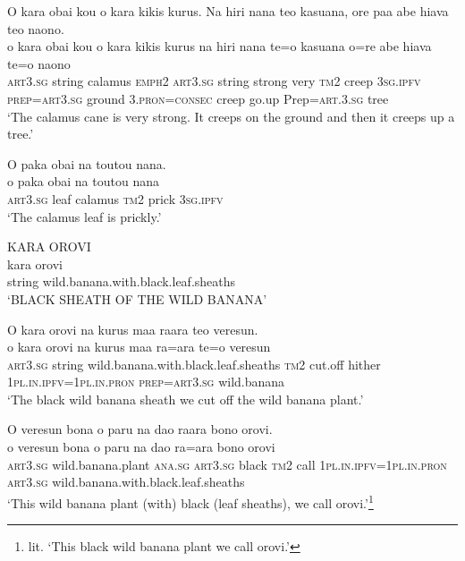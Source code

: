 \ea\label{ex:text7-48}
O kara obai kou o kara kikis kurus. Na hiri nana teo kasuana, ore paa abe hiava teo naono.\\
\gll o	kara	obai	kou	o	kara	kikis	kurus	na	hiri	nana	te=o	kasuana	o=re	abe	hiava	te=o	naono\\
     \textsc{art}3.\textsc{sg}	string	calamus	\textsc{emph}2	\textsc{art}3.\textsc{sg}	string	strong	very	\textsc{tm}2	creep	3\textsc{sg}.\textsc{ipfv}	\textsc{prep}=\textsc{art}3.\textsc{sg}	ground	3.\textsc{pron}=\textsc{consec}	creep	go.up	Prep=\textsc{art}.3.\textsc{sg}	tree\\
\glt `The calamus cane is very strong. It creeps on the ground and then it creeps up a tree.'
\z

\ea\label{ex:text7-49}
O paka obai na toutou nana.\\
\gll o	paka	obai	na	toutou	nana\\
     \textsc{art}3.\textsc{sg}	leaf	calamus	\textsc{tm}2	prick	3\textsc{sg}.\textsc{ipfv}\\
\glt `The calamus leaf is prickly.'
\z

\newpage
\ea\label{ex:text7-50}
KARA OROVI\\
\gll kara	orovi\\
     string	wild.banana.with.black.leaf.sheaths\\
\glt `BLACK SHEATH OF THE WILD BANANA'
\z

\ea\label{ex:text7-51}
O kara orovi na kurus maa raara teo veresun.\\
\gll o	kara	orovi	na	kurus	maa	ra=ara	te=o	veresun\\
     \textsc{art}3.\textsc{sg}	string	wild.banana.with.black.leaf.sheaths	\textsc{tm}2	cut.off	hither	1\textsc{pl}.\textsc{in}.\textsc{ipfv}=1\textsc{pl}.\textsc{in}.\textsc{pron}	\textsc{prep}=\textsc{art}3.\textsc{sg}	wild.banana\\
\glt `The black wild banana sheath we cut off the wild banana plant.'
\z

\ea\label{ex:text7-52}
O veresun bona o paru na dao raara bono orovi.\\
\gll o	veresun	bona	o	paru	na	dao	ra=ara	bono	orovi\\
     \textsc{art}3.\textsc{sg}	wild.banana.plant	\textsc{ana}.\textsc{sg}	\textsc{art}3.\textsc{sg}	black	\textsc{tm}2	call	1\textsc{pl}.\textsc{in}.\textsc{ipfv}=1\textsc{pl}.\textsc{in}.\textsc{pron}	\textsc{art}3.\textsc{sg}	wild.banana.with.black.leaf.sheaths\\
\glt `This wild banana plant (with) black (leaf sheaths), we call orovi.'\footnote{lit. `This black wild banana plant we call orovi.'}
\z

